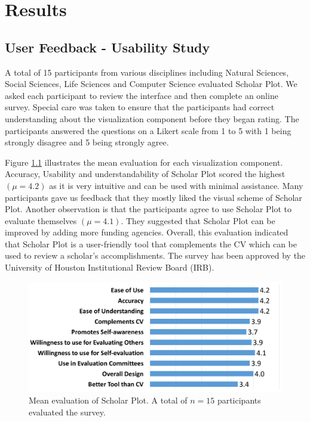 \chapter{Results}\label{chap:Results}

\section{User Feedback - Usability Study}



A total of 15 participants from various disciplines including Natural Sciences, Social Sciences, Life Sciences and Computer Science evaluated Scholar Plot. We asked each participant to review the interface and then complete an online survey. Special care was taken to ensure that the participants had correct understanding about the visualization component before they began rating. The participants answered the questions on a Likert scale from 1 to 5 with 1 being strongly disagree and 5 being strongly agree.

Figure \ref{fig:UserStudy} illustrates the mean evaluation for each visualization component. Accuracy, Usability and understandability of Scholar Plot scored the highest $(\mu = 4.2)$ as it is very intuitive and can be used with minimal assistance. Many participants gave us feedback that they mostly liked the visual scheme of Scholar Plot. Another observation is that the participants agree to use Scholar Plot to evaluate themselves $(\mu = 4.1)$. They suggested that Scholar Plot can be improved by adding more funding agencies. Overall, this evaluation indicated that Scholar Plot is a user-friendly tool that complements the CV which can be used to review a scholar's accomplishments. The survey has been approved by the University of Houston Institutional Review Board (IRB).

 \begin{figure}[!htb]
  \centering
  \includegraphics[width=\textwidth]{figures/fig_survey_chart}
  \caption{Mean evaluation of Scholar Plot. A total of $n=15$ participants evaluated the survey.}
  \label{fig:UserStudy}
\end{figure}



